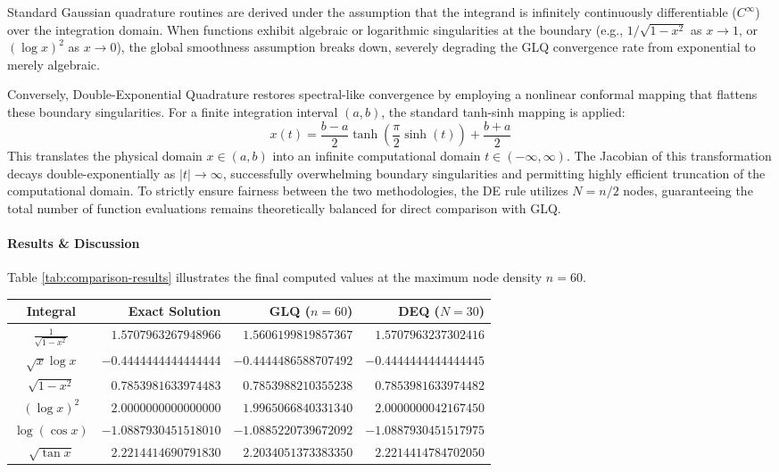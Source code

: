 \begin{solution}

	Standard Gaussian quadrature routines are derived under the assumption that
	the integrand is infinitely continuously differentiable ($C^\infty$) over the
	integration domain. When functions exhibit algebraic or logarithmic
	singularities at the boundary (e.g., $1/\sqrt{1-x^2}$ as $x \to 1$, or $(\log
		x)^2$ as $x \to 0$), the global smoothness assumption breaks down, severely
	degrading the GLQ convergence rate from exponential to merely algebraic.

	Conversely, Double-Exponential Quadrature restores spectral-like convergence
	by employing a nonlinear conformal mapping that flattens these boundary
	singularities. For a finite integration interval $(a, b)$, the standard
	tanh-sinh mapping is applied:
	\[
		x(t) = \frac{b-a}{2} \tanh\left(\frac{\pi}{2} \sinh(t)\right) + \frac{b+a}{2}
	\]
	This translates the physical domain $x \in (a, b)$ into an infinite
	computational domain $t \in (-\infty, \infty)$. The Jacobian of this
	transformation decays double-exponentially as $|t| \to \infty$, successfully
	overwhelming boundary singularities and permitting highly efficient truncation
	of the computational domain. To strictly ensure fairness between the two
	methodologies, the DE rule utilizes $N = n/2$ nodes, guaranteeing the total
	number of function evaluations remains theoretically balanced for direct
	comparison with GLQ.

	\paragraph{Results \& Discussion}
	Table \ref{tab:comparison-results} illustrates the final computed values at
	the maximum node density $n=60$.

	\begin{center}
		\centering
		\label{tab:comparison-results}
		\renewcommand{\arraystretch}{1.2}
		\begin{tabular}{c r r r}
			\toprule
			Integral                 & Exact Solution        & GLQ ($n=60$)          & DEQ ($N=30$)          \\
			\midrule
			$\frac{1}{\sqrt{1-x^2}}$ & $1.5707963267948966$  & $1.5606199819857367$  & $1.5707963237302416$  \\
			$\sqrt{x} \log x$        & $-0.4444444444444444$ & $-0.4444486588707492$ & $-0.4444444444444445$ \\
			$\sqrt{1-x^2}$           & $0.7853981633974483$  & $0.7853988210355238$  & $0.7853981633974482$  \\
			$(\log x)^2$             & $2.0000000000000000$  & $1.9965066840331340$  & $2.0000000042167450$  \\
			$\log(\cos x)$           & $-1.0887930451518010$ & $-1.0885220739672092$ & $-1.0887930451517975$ \\
			$\sqrt{\tan x}$          & $2.2214414690791830$  & $2.2034051373383350$  & $2.2214414784702050$  \\
			\bottomrule
		\end{tabular}
	\end{center}


\end{solution}
